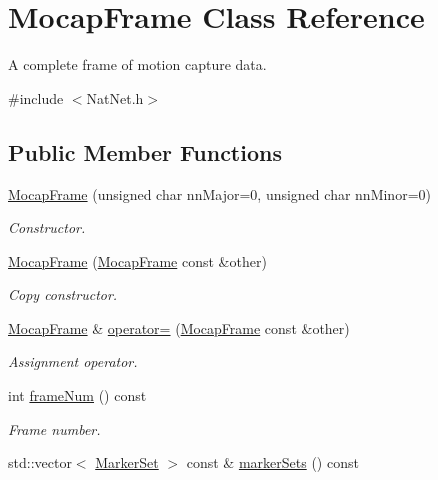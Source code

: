 \hypertarget{classMocapFrame}{\section{\-Mocap\-Frame \-Class \-Reference}
\label{classMocapFrame}
}


\-A complete frame of motion capture data.  




{\ttfamily \#include $<$\-Nat\-Net.\-h$>$}

\subsection*{\-Public \-Member \-Functions}
\begin{DoxyCompactItemize}
\item 
\hyperlink{classMocapFrame_ae374819e609e2e32d49a3816e0955f0c}{\-Mocap\-Frame} (unsigned char nn\-Major=0, unsigned char nn\-Minor=0)
\begin{DoxyCompactList}\small\item\em \-Constructor. \end{DoxyCompactList}\item 
\hypertarget{classMocapFrame_aaf32d0e6a7ad581690325c5886f0c96f}{\hyperlink{classMocapFrame_aaf32d0e6a7ad581690325c5886f0c96f}{\-Mocap\-Frame} (\hyperlink{classMocapFrame}{\-Mocap\-Frame} const \&other)}\label{classMocapFrame_aaf32d0e6a7ad581690325c5886f0c96f}

\begin{DoxyCompactList}\small\item\em \-Copy constructor. \end{DoxyCompactList}\item 
\hypertarget{classMocapFrame_a9649550bd0d15aa01e377857c098319f}{\hyperlink{classMocapFrame}{\-Mocap\-Frame} \& \hyperlink{classMocapFrame_a9649550bd0d15aa01e377857c098319f}{operator=} (\hyperlink{classMocapFrame}{\-Mocap\-Frame} const \&other)}\label{classMocapFrame_a9649550bd0d15aa01e377857c098319f}

\begin{DoxyCompactList}\small\item\em \-Assignment operator. \end{DoxyCompactList}\item 
int \hyperlink{classMocapFrame_a646c39de6dc91cd3f1acb8b90cfc90c1}{frame\-Num} () const 
\begin{DoxyCompactList}\small\item\em \-Frame number. \end{DoxyCompactList}\item 
\hypertarget{classMocapFrame_a0cf3cb2de725cb46186cedb13ff0a71c}{std\-::vector$<$ \hyperlink{classMarkerSet}{\-Marker\-Set} $>$ const \& \hyperlink{classMocapFrame_a0cf3cb2de725cb46186cedb13ff0a71c}{marker\-Sets} () const }\label{classMocapFrame_a0cf3cb2de725cb46186cedb13ff0a71c}


\end{DoxyCompactItemize}
